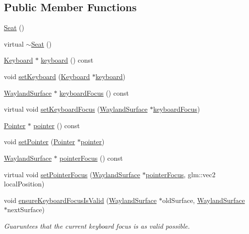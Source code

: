 \subsection*{Public Member Functions}
\begin{DoxyCompactItemize}
\item 
\hyperlink{classmotorcar_1_1Seat_a7fbd40f66e504cd214797c95dd83c94c}{Seat} ()
\item 
virtual \hyperlink{classmotorcar_1_1Seat_a28ee91e80c53d92b8729adf9248dca97}{$\sim$\-Seat} ()
\item 
\hyperlink{classmotorcar_1_1Keyboard}{Keyboard} $\ast$ \hyperlink{classmotorcar_1_1Seat_ada346c548a070764bd05b7666b04ba28}{keyboard} () const 
\item 
void \hyperlink{classmotorcar_1_1Seat_ac73c8ea32eaffeccbed3fdfe4d115428}{set\-Keyboard} (\hyperlink{classmotorcar_1_1Keyboard}{Keyboard} $\ast$\hyperlink{classmotorcar_1_1Seat_ada346c548a070764bd05b7666b04ba28}{keyboard})
\item 
\hyperlink{classmotorcar_1_1WaylandSurface}{Wayland\-Surface} $\ast$ \hyperlink{classmotorcar_1_1Seat_a4ac963bf0d54b6e4a77c0594b37d756f}{keyboard\-Focus} () const 
\item 
virtual void \hyperlink{classmotorcar_1_1Seat_ab8f8eb12135b5db96238c37653fb54d1}{set\-Keyboard\-Focus} (\hyperlink{classmotorcar_1_1WaylandSurface}{Wayland\-Surface} $\ast$\hyperlink{classmotorcar_1_1Seat_a4ac963bf0d54b6e4a77c0594b37d756f}{keyboard\-Focus})
\item 
\hyperlink{classmotorcar_1_1Pointer}{Pointer} $\ast$ \hyperlink{classmotorcar_1_1Seat_a98193b334b8a8278b29926f9f97300c6}{pointer} () const 
\item 
void \hyperlink{classmotorcar_1_1Seat_ae84831d0c43b89bbeb0ff7c1b0186c5d}{set\-Pointer} (\hyperlink{classmotorcar_1_1Pointer}{Pointer} $\ast$\hyperlink{classmotorcar_1_1Seat_a98193b334b8a8278b29926f9f97300c6}{pointer})
\item 
\hyperlink{classmotorcar_1_1WaylandSurface}{Wayland\-Surface} $\ast$ \hyperlink{classmotorcar_1_1Seat_a996631e534a7c9424245c03c1781fd2a}{pointer\-Focus} () const 
\item 
virtual void \hyperlink{classmotorcar_1_1Seat_a0f7254a717c97aba66b15ca8d437734c}{set\-Pointer\-Focus} (\hyperlink{classmotorcar_1_1WaylandSurface}{Wayland\-Surface} $\ast$\hyperlink{classmotorcar_1_1Seat_a996631e534a7c9424245c03c1781fd2a}{pointer\-Focus}, glm\-::vec2 local\-Position)
\item 
void \hyperlink{classmotorcar_1_1Seat_a40f9d76a799f70acd1cd3ad5f0360aad}{ensure\-Keyboard\-Focus\-Is\-Valid} (\hyperlink{classmotorcar_1_1WaylandSurface}{Wayland\-Surface} $\ast$old\-Surface, \hyperlink{classmotorcar_1_1WaylandSurface}{Wayland\-Surface} $\ast$next\-Surface)
\begin{DoxyCompactList}\small\item\em Guaruntees that the current keyboard focus is as valid possible. \end{DoxyCompactList}\end{DoxyCompactItemize}


